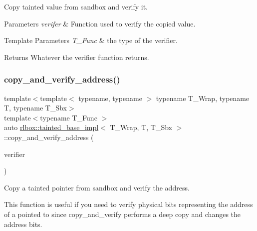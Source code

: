 Copy tainted value from sandbox and verify it. 


\begin{DoxyParams}{Parameters}
{\em verifer} & Function used to verify the copied value. \\
\hline
\end{DoxyParams}

\begin{DoxyTemplParams}{Template Parameters}
{\em T\+\_\+\+Func} & the type of the verifier. \\
\hline
\end{DoxyTemplParams}
\begin{DoxyReturn}{Returns}
Whatever the verifier function returns. 
\end{DoxyReturn}
\mbox{\label{classrlbox_1_1tainted__base__impl_ad34419b3444d0bf37e25ecf7d37fbe0b}} 
\subsubsection{\texorpdfstring{copy\+\_\+and\+\_\+verify\+\_\+address()}{copy\_and\_verify\_address()}}
{\footnotesize\ttfamily template$<$template$<$ typename, typename $>$ typename T\+\_\+\+Wrap, typename T, typename T\+\_\+\+Sbx$>$ \\
template$<$typename T\+\_\+\+Func $>$ \\
auto \hyperlink{classrlbox_1_1tainted__base__impl}{rlbox\+::tainted\+\_\+base\+\_\+impl}$<$ T\+\_\+\+Wrap, T, T\+\_\+\+Sbx $>$\+::copy\+\_\+and\+\_\+verify\+\_\+address (\begin{DoxyParamCaption}\item[{T\+\_\+\+Func}]{verifier }\end{DoxyParamCaption})\hspace{0.3cm}{\ttfamily [inline]}}



Copy a tainted pointer from sandbox and verify the address. 

This function is useful if you need to verify physical bits representing the address of a pointed to since copy\+\_\+and\+\_\+verify performs a deep copy and changes the address bits.


